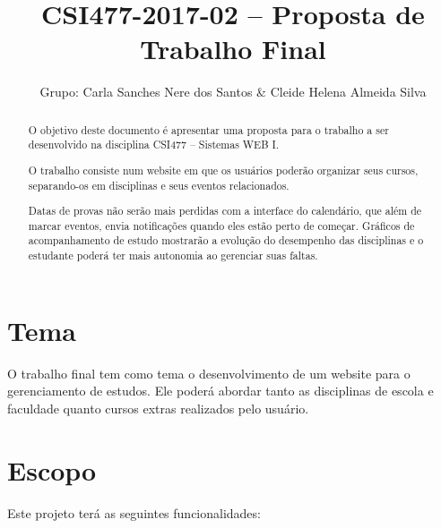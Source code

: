 \documentclass[10pt,a4paper,article]{abntex2}
\title{CSI477-2017-02 -- Proposta de Trabalho Final}
\author{Grupo: Carla Sanches Nere dos Santos \& Cleide Helena Almeida Silva}
\begin{document}
	\maketitle

	\begin{abstract}
		O objetivo deste documento é apresentar uma proposta para o trabalho a ser desenvolvido na disciplina CSI477 -- Sistemas WEB I. \newline
		
		O trabalho consiste num website em que os usuários poderão organizar seus cursos, separando-os em disciplinas e seus eventos relacionados.\newline
	
		
		Datas de provas não serão mais perdidas com a interface do calendário, que além de marcar eventos, envia notificações quando eles estão perto de começar. Gráficos de acompanhamento de estudo mostrarão a evolução do desempenho das disciplinas e o estudante poderá ter mais autonomia ao gerenciar suas faltas.
	\end{abstract}

	\section{Tema}

		O trabalho final tem como tema o desenvolvimento de um website para o gerenciamento de estudos. Ele poderá abordar tanto as disciplinas de escola e faculdade quanto cursos extras realizados pelo usuário.

	\section{Escopo}

		Este projeto terá as seguintes funcionalidades:
		
\end{document}

